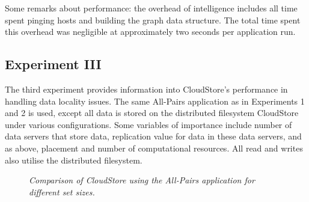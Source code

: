 \documentclass{rspublic}
\begin{document}
Some remarks about performance: the overhead of intelligence includes
all time spent pinging hosts and building the graph data structure.  The
total time spent this overhead was negligible at approximately two
seconds per application run.

\subsection{Experiment III} The third experiment provides information
into CloudStore's performance in handling data locality issues.  The
same All-Pairs application as in Experiments 1 and 2 is used, except all
data is stored on the distributed filesystem CloudStore under various
configurations.  Some variables of importance include number of data
servers that store data, replication value for data in these data
servers, and as above, placement and number of computational resources.
All read and writes also utilise the distributed filesystem.  
\begin{center}
\begin{figure}
\caption{\textit{Comparison of CloudStore using the All-Pairs
application for different set sizes.}}
\label{experiment3}
\end{figure}
\end{center}
\end{document}
